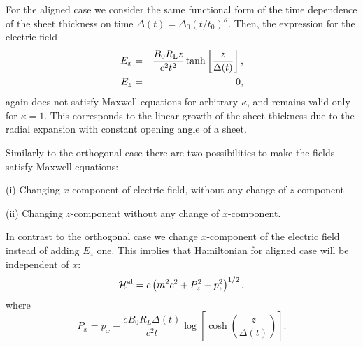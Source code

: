 \documentclass[useAMS,usenatbib]{mn2e}
\begin{document}
For the aligned case we consider the same functional form of the time dependence of the sheet thickness on time 
$\Delta(t)=\Delta_0(t/t_0)^{\kappa}$. Then, the expression for the electric field
\begin{eqnarray}
E_x & = & \dfrac{B_0 R_{\rm L} z}{c^2t^2} \tanh\left[\frac{z}{\Delta(t)}\right], 
\label{eqnB:exO2d}
\\
\label{Appendix:ez.al}
E_z & = & 0,
\end{eqnarray}
again does not satisfy Maxwell equations for arbitrary $\kappa$, and remains valid only for $\kappa = 1$. This corresponds to the linear growth of the sheet thickness due to the radial expansion with constant opening angle of a sheet.
 
Similarly to the orthogonal case there are two possibilities to make the fields satisfy Maxwell equations:

 (i) Changing $x$-component of electric field, without any change of $z$-component

 (ii) Changing $z$-component without any change of $x$-component.

In contrast to the orthogonal case we change $x$-component of the
electric field instead of adding $E_{z}$ one. This implies that Hamiltonian for aligned case 
will be independent of $x$:
\begin{equation}
\begin{split}
\mathcal{H}^{\rm al}
=c \left(m^2c^2+ P^{2}_{z} + p^{2}_{z}\right)^{1/2},
\end{split}
\end{equation}
where
\begin{equation}
P_{x} = p_{x} - \dfrac{eB_0R_L\Delta(t)}{c^2t}
\log\left[\cosh\left(\dfrac{z}{\Delta(t)}\right)\right].
\end{equation}
\end{document}
